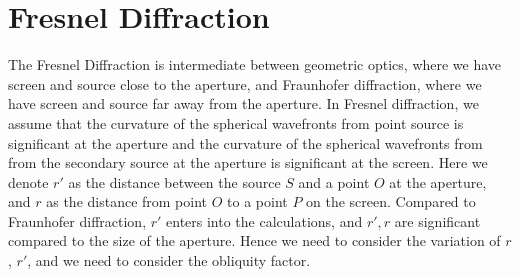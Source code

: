 \documentclass[11pt]{book}
\theoremstyle{break}
\theoremstyle{break}
\begin{document}
\chapter{Fresnel Diffraction}
The Fresnel Diffraction is intermediate between geometric optics, where we have screen and source close to the aperture, and Fraunhofer diffraction, where we have screen and source far away from the aperture. In Fresnel diffraction, we assume that the curvature of the spherical wavefronts from point source is significant at the aperture and the curvature of the spherical wavefronts from from the secondary source at the aperture is significant at the screen. Here we denote $r'$ as the distance between the source $S$ and a point $O$ at the aperture, and $r$ as the distance from point $O$ to a point $P$ on the screen. Compared to Fraunhofer diffraction, $r'$ enters into the calculations, and $r',r$ are significant compared to the size of the aperture. Hence we need to consider the variation of $r$, $r'$, and we need to consider the obliquity factor.\\
\end{document}
